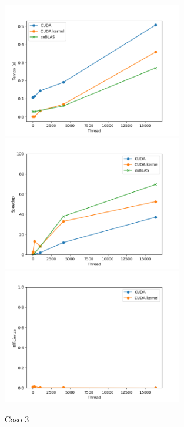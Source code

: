 \begin{figure}[ht]
    \centering
    \includegraphics[width=0.7\textwidth]{./imgs/graphs/caso_c.png}
    \includegraphics[width=0.7\textwidth]{./imgs/graphs/caso_c_speedup.png}
    \includegraphics[width=0.7\textwidth]{./imgs/graphs/caso_c_efficiency.png}
    \caption{Caso 3}
\end{figure}

